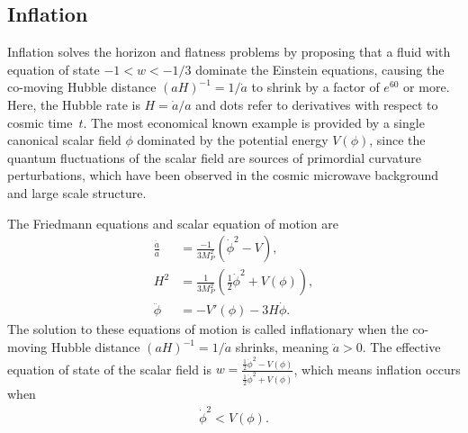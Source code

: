 \documentclass[aps,amsfonts,amsmath,prd,preprint,nofootinbib,superscriptaddress]{revtex4}
\newcommand{\MMp}{{M_P^2}}
\begin{document}
\begin{appendix}



\section{Inflation}\label{sec:inflation}
Inflation solves the horizon and flatness problems \cite{guth} by proposing that a fluid with equation of state $-1< w < -1/3$ dominate the Einstein equations, 
causing the co-moving Hubble distance $(a H)^{-1} = 1/\dot a$ to shrink by a factor of $e^{60}$ or more. 
Here, the Hubble rate is $H = \dot a/a$ and dots refer to derivatives with respect to cosmic time~$t$.  
The most economical known example is provided by a single canonical scalar field $\phi$ dominated by the potential energy $V(\phi)$, 
since the quantum fluctuations of the scalar field are sources of primordial curvature perturbations, which have been observed 
in the cosmic microwave background and large scale structure\cite{mukhanov, steinhardt}.  

 
The Friedmann equations and scalar equation of motion are
\begin{align}
\frac{\ddot a}{a} &= \frac{-1}{3\MMp}\left(\dot\phi^2 - V  \right),\label{eq:addot}\\
H^2 &= \frac{1}{3\MMp}\left(\tfrac{1}{2}\dot\phi^2 + V(\phi)\right),\label{eq:adot}\\
\ddot \phi &= -V'(\phi) - 3 H \dot \phi.  \label{eq:scalareom}
\end{align}
The solution to these equations of motion is called inflationary when the co-moving Hubble distance $(a H)^{-1} = 1/\dot a$ shrinks, meaning $\ddot a > 0$. 
The effective equation of state of the scalar field is $w = \frac{\tfrac{1}{2}\dot\phi^2 - V(\phi)}{\tfrac{1}{2}\dot\phi^2 + V(\phi)}$, which means inflation occurs when
\begin{align}
\dot\phi^2 < V(\phi).
\end{align}





\end{appendix}
\end{document}
